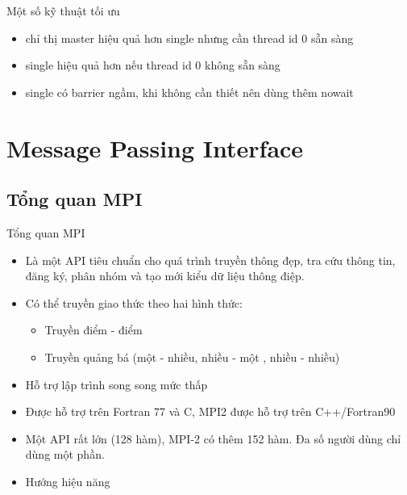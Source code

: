 \documentclass[10pt]{beamer}
\theoremstyle{remark}
\numberwithin{algocf}{section}
\numberwithin{equation}{section}
\numberwithin{dl}{section}
\numberwithin{figure}{section}
\begin{document}
\begin{frame}[fragile]{Một số kỹ thuật tối ưu}
    \begin{itemize}
        \item chỉ thị master hiệu quả hơn single nhưng cần thread id 0 sẵn sàng
        \item single hiệu quả hơn nếu thread id 0 không sẵn sàng
        \item single có barrier ngầm, khi không cần thiết nên dùng thêm nowait
    \end{itemize}
\end{frame}

\section{Message Passing Interface}

\subsection{Tổng quan MPI}

\begin{frame}{Tổng quan MPI}
    \begin{itemize}
        \item Là một API tiêu chuẩn cho quá trình truyền thông đẹp, tra cứu thông tin, đăng ký, phân nhóm và tạo mới kiểu dữ liệu thông điệp.
        \item Có thể truyền giao thức theo hai hình thức:
        \begin{itemize}
            \item Truyền điểm - điểm
            \item Truyền quảng bá (một - nhiều, nhiều - một , nhiều - nhiều)
        \end{itemize}
        \item Hỗ trợ lập trình song song mức thấp
        \item Được hỗ trợ trên Fortran 77 và C, MPI2 được hỗ trợ trên C++/Fortran90
        \item Một API rất lớn (128 hàm), MPI-2 có thêm 152 hàm. Đa số người dùng chỉ dùng một phần.
        \item Hướng hiệu năng
    \end{itemize}
\end{frame}
\end{document}
